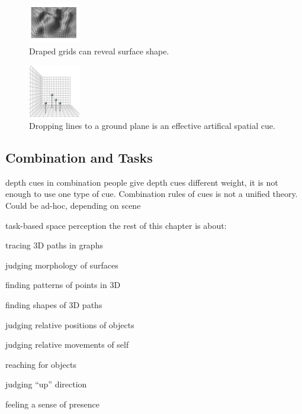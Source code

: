 \begin{mdframed}
\begin{multicols}{3}
    \begin{figure}[H]
        \centering
        \includegraphics[width=0.2\textwidth]{draped_grid.png}
        \caption{Draped grids can reveal surface shape.}
    \end{figure}
    \begin{figure}[H]
        \centering
        \includegraphics[width=0.2\textwidth]{droplines.png}
        \caption{Dropping lines to a ground plane is an effective artifical
        spatial cue.}
    \end{figure}

\end{multicols}
\end{mdframed}


\begin{mdframed}
\subsection{Combination and Tasks}
\begin{multicols}{2}
\begin{compactdesc}
\item[depth cues in combination] people give depth cues different weight,
    it is not enough to use one type of cue. Combination rules of cues is not
    a unified theory. Could be ad-hoc, depending on scene
\item[task-based space perception] the rest of this chapter is about:
    \begin{compactenum}
    \item tracing 3D paths in graphs
    \item judging morphology of surfaces
    \item finding patterns of points in 3D
    \item finding shapes of 3D paths
    \item judging relative positions of objects
    \item judging relative movements of self
    \item reaching for objects
    \item judging ``up'' direction
    \item feeling a sense of presence
    \end{compactenum}
\end{compactdesc}
\end{multicols}\end{mdframed}



